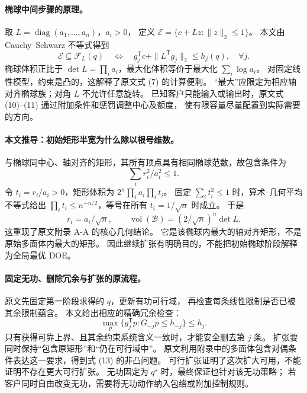 \paragraph{椭球中间步骤的原理。}
取 $L=\operatorname{diag}(a_1,\ldots,a_n)$，$a_i>0$，
定义 $\mathcal E=\{c+Lz:\|z\|_2\leq1\}$。
本文由 Cauchy--Schwarz 不等式得到
\begin{equation}
 \mathcal E\subseteq\mathcal F_L(q)
 \quad\Longleftrightarrow\quad
 g_j^{\mathsf T}c+\|L^{\mathsf T}g_j\|_2\leq h_j(q),\quad\forall j.
 \label{eq:eng-s11-ellipsoid-cert}
\end{equation}
椭球体积正比于 $\det L=\prod_i a_i$，最大化体积等价于最大化 $\sum_i\log a_i$。
对固定线性模型，约束是凸的，这解释了原文式 (7) 的计算便利。
“最大”应限定为相应轴对齐椭球族；对角 $L$ 不允许任意旋转。
已知客户只能输入或输出时，原文式 (10)--(11) 通过附加条件和惩罚调整中心及额度，
使有限容量尽量配置到实际需要的方向。

\paragraph{本文推导：初始矩形半宽为什么除以根号维数。}
与椭球同中心、轴对齐的矩形，其所有顶点具有相同椭球范数，故包含条件为
\begin{equation}
 \sum_i r_i^2/a_i^2\leq1.
 \label{eq:eng-s11-innerbox}
\end{equation}
令 $t_i=r_i/a_i>0$，矩形体积为 $2^n\prod_i a_i\prod_i t_i$。
固定 $\sum_i t_i^2\leq1$ 时，算术--几何平均不等式给出
$\prod_i t_i\leq n^{-n/2}$，等号在所有 $t_i=1/\sqrt n$ 时成立。
于是
\begin{equation}
 r_i=a_i/\sqrt n,\qquad
 \operatorname{vol}(\mathcal B)=
 (2/\sqrt n)^n\det L.
 \label{eq:eng-s11-radius}
\end{equation}
这重现了原文附录 A-A 的核心几何结论。
它是该椭球内最大的轴对齐矩形，不是原始多面体内最大的矩形。
因此继续扩张有明确目的，不能把初始椭球阶段解释为全局最优 DOE。

\paragraph{固定无功、删除冗余与扩张的原流程。}
原文先固定第一阶段求得的 $q$，更新有功可行域，
再检查每条线性限制是否已被其余限制蕴含。
本文给出相应的精确冗余检查：
\begin{equation}
 \max_p\{g_j^{\mathsf T}p:G_{-j}p\leq h_{-j}\}\leq h_j.
 \label{eq:eng-s11-redundancy}
\end{equation}
只有获得可靠上界、且其余约束系统含义一致时，才能安全删去第 $j$ 条。
扩张要同时保持“包含原矩形”和“仍在可行域中”。
原文利用附录中的多面体包含对偶条件表达这一要求，得到式 (13) 的非凸问题。
可行扩张证明了这次扩大可用，不能证明不存在更大可行扩张。
无功固定为 $q^\star$ 时，最终保证也针对该无功策略；
若客户同时自由改变无功，需要将无功动作纳入包络或附加控制规则。

